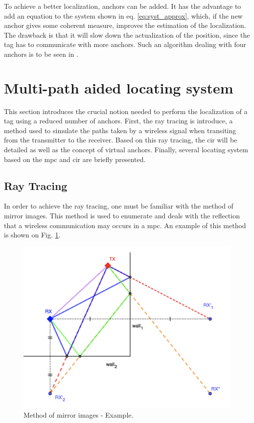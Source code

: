To achieve a better localization, anchors can be added. It has the advantage to add an equation to the system shown in eq. \ref{eq:syst_approx}, which, if the new anchor gives some coherent measure, improves the estimation of the localization. The drawback is that it will slow down the actualization of the position, since the tag has to communicate with more anchors. Such an algorithm dealing with four anchors is to be seen in \cite{guyard2019navigation}.

\section{Multi-path aided locating system}
\label{mpls}

This section introduces the crucial notion needed to perform the localization of a tag using a reduced number of anchors. First, the ray tracing is introduce, a method used to simulate the paths taken by a wireless signal when transiting from the transmitter to the receiver. Based on this ray tracing, the \gls{cir} will be detailed as well as the concept of virtual anchors. Finally, several locating system based on the \gls{mpc} and \gls{cir} are briefly presented. 

\subsection{Ray Tracing}
\label{ray_tracing}

In order to achieve the ray tracing, one must be familiar with the method of mirror images. This method is used to enumerate and deals with the reflection that a wireless communication may occurs in a \gls{mpc}. An example of this method is shown on Fig. \ref{fig:image_method}. 

\begin{figure}[H]
\centering
\includegraphics[width=.7\linewidth]{Images/mirror_image.png}
\caption{Method of mirror images - Example. \label{fig:image_method}}
\end{figure}

